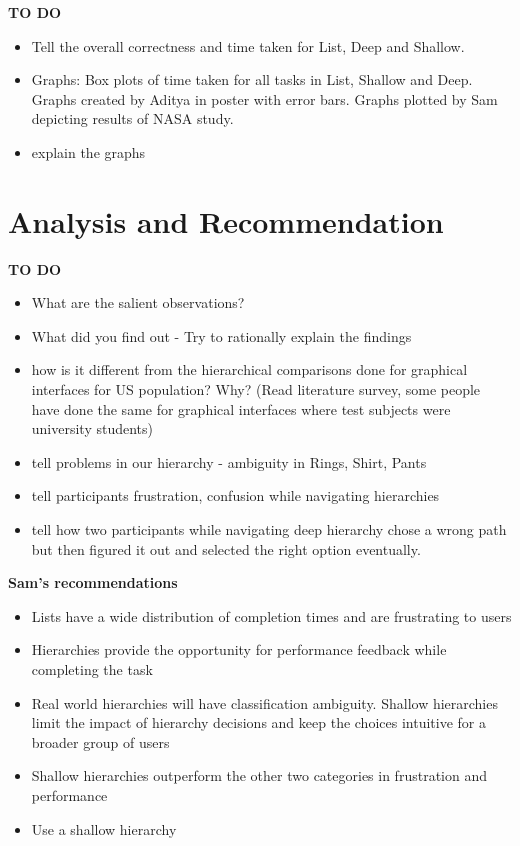 \documentclass{sigchi}
\begin{document}
\textbf{TO DO}
\begin{itemize}
\item Tell the overall correctness and time taken for List, Deep and Shallow. 
\item Graphs: Box plots of time taken for all tasks in List, Shallow and Deep. Graphs created by Aditya in poster with error bars. Graphs plotted by Sam depicting results of NASA study. 
\item explain the graphs
\end{itemize}

\section{Analysis and Recommendation}
\textbf{TO DO}
\begin{itemize}
\item What are the salient observations? 
\item What did you find out - Try to rationally explain the findings
\item how is it different from the hierarchical comparisons done for graphical interfaces for US population? Why? (Read literature survey, some people have done the same for graphical interfaces where test subjects were university students) 
\item tell problems in our hierarchy - ambiguity in Rings, Shirt, Pants
\item tell participants frustration, confusion while navigating hierarchies
\item tell how two participants while navigating deep hierarchy chose a wrong path but then figured it out and selected the right option eventually. 
\end{itemize}


\textbf{Sam's recommendations}

\begin{itemize}
\item  Lists have a wide distribution of completion times and are frustrating to users
\item Hierarchies provide the opportunity for performance feedback while completing the task
\item Real world hierarchies will have classification ambiguity. Shallow hierarchies limit the impact of hierarchy decisions and keep the choices intuitive for a broader group of users
\item Shallow hierarchies outperform the other two categories in frustration and performance
\item Use a shallow hierarchy
\end{itemize}
\end{document}
